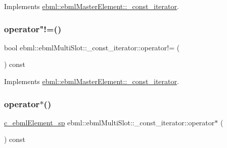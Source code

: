 Implements \mbox{\hyperlink{classebml_1_1ebmlMasterElement_1_1__const__iterator_a64a4853ad363358987eb6492579cd503}{ebml\+::ebml\+Master\+Element\+::\+\_\+const\+\_\+iterator}}.

\mbox{\label{classebml_1_1ebmlMultiSlot_1_1__const__iterator_a9a1c8df8a22d52ecb55de9f151f383e0}} 
\subsubsection{\texorpdfstring{operator"!=()}{operator!=()}}
{\footnotesize\ttfamily bool ebml\+::ebml\+Multi\+Slot\+::\+\_\+const\+\_\+iterator\+::operator!= (\begin{DoxyParamCaption}\item[{const \mbox{\hyperlink{classebml_1_1ebmlMasterElement_1_1__const__iterator}{ebml\+Master\+Element\+::\+\_\+const\+\_\+iterator}} \&}]{ }\end{DoxyParamCaption}) const\hspace{0.3cm}{\ttfamily [virtual]}}



Implements \mbox{\hyperlink{classebml_1_1ebmlMasterElement_1_1__const__iterator_ac62d190e9da49236835f8219ec307d22}{ebml\+::ebml\+Master\+Element\+::\+\_\+const\+\_\+iterator}}.

\mbox{\label{classebml_1_1ebmlMultiSlot_1_1__const__iterator_ad4dfa7a3f08d535fe83c93c762009483}} 
\subsubsection{\texorpdfstring{operator$\ast$()}{operator*()}}
{\footnotesize\ttfamily \mbox{\hyperlink{namespaceebml_a2deef4e8071531b32e3533f1bf978917}{c\+\_\+ebml\+Element\+\_\+sp}} ebml\+::ebml\+Multi\+Slot\+::\+\_\+const\+\_\+iterator\+::operator$\ast$ (\begin{DoxyParamCaption}{ }\end{DoxyParamCaption}) const\hspace{0.3cm}{\ttfamily [virtual]}}



